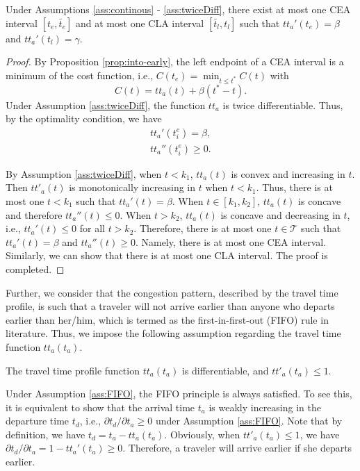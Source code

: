 \begin{prop}
Under Assumptions \ref{ass:continous} - \ref{ass:twiceDiff}, there exist at most one CEA interval $[t_e, \bar t_e]$ and at most one CLA interval $[\bar t_l, t_l]$ such that $tt_a'(t_e)= \beta$ and $ tt_a'(t_l)= \gamma$.
\end{prop}
\begin{proof}
By Proposition \ref{prop:into-early}, the left endpoint of a CEA interval is a minimum of the cost function, i.e., $C(t_e) = \min_{t \le t^*} C(t)$ with 
   $$C(t) = tt_a(t) + \beta (t^* - t).$$
Under Assumption \ref{ass:twiceDiff}, the function $tt_a$ is twice differentiable. Thus, by the optimality condition, we have 
\begin{align}
tt_a'(t_i^e) = \beta,\\
tt_a''(t_i^e) \geq 0.
\end{align}

By Assumption \ref{ass:twiceDiff}, when $t < k_1$, $tt_a(t)$ is convex and increasing in $t$. Then $tt'_a(t)$ is monotonically increasing in $t$ when $t< k_1$. Thus, there is at most one $t < k_1$ such that $tt_a'(t) = \beta$. When $t \in [k_1, k_2]$,  $tt_a(t)$ is concave and therefore $tt_a''(t) \le 0$. When $t >k_2$,  $tt_a(t)$ is concave and decreasing in $t$, i.e., $tt_a'(t)\le 0$ for all $t > k_2$.  Therefore, there is at most one $t \in \mathcal{T}$ such that $tt_a'(t) = \beta$ and $tt_a''(t) \geq 0$. Namely, there is at most one CEA interval. Similarly, we can show that there is at most one CLA interval. The proof is completed. 
\end{proof}



Further, we consider that the congestion pattern, described by the travel time profile, is such that a traveler will not arrive earlier than anyone who departs earlier than her/him, which is termed as the first-in-first-out (FIFO) rule in literature. Thus, we impose the following assumption regarding the travel time function  $tt_a(t_a)$.



\begin{assumption}\label{ass:FIFO}
The travel time profile function $tt_a(t_a)$ is differentiable, and $tt'_a(t_a) \le 1$. 
\end{assumption}


Under Assumption \ref{ass:FIFO}, the FIFO principle is always satisfied. To see this, it is equivalent to show that the arrival time $t_a$ is weakly increasing in the departure time $t_d$, i.e., $\partial t_d / \partial t_a \ge 0$ under Assumption \ref{ass:FIFO}.  Note that by definition, we have $ t_d = t_a - tt_a(t_a)$.  Obviously, when $tt'_a(t_a) \le 1$, we have $\partial t_d / \partial t_a = 1 - tt_a'(t_a) \ge 0$. Therefore, a traveler will arrive earlier if she departs earlier. 



